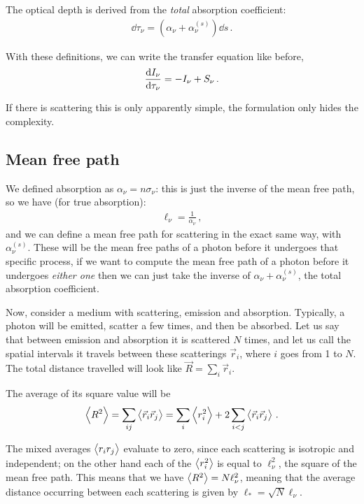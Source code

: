 \documentclass[main.tex]{subfiles}
\begin{document}
The optical depth is derived from the \emph{total} absorption coefficient: 
%
\begin{align}
\dd{\tau_{\nu }} = (\alpha_{\nu } + \alpha_{\nu }^{(s)}) \dd{s}
\,.
\end{align}

With these definitions, we can write the transfer equation like before, 
%
\begin{align}
\dv{I_\nu }{\tau_{\nu }} = - I_\nu + S_\nu 
\,.
\end{align}

If there is scattering this is only apparently simple, the formulation only hides the complexity. 

\subsection{Mean free path}

We defined absorption as \(\alpha_{\nu } = n \sigma_{\nu }\): this is just the inverse of the mean free path, so we have (for true absorption):
%
\begin{align}
\ell_{\nu } = \frac{1}{\alpha_{\nu }}
\,,
\end{align}
%
and we can define a mean free path for scattering in the exact same way, with \(\alpha_{\nu }^{(s)}\). 
These will be the mean free paths of a photon before it undergoes that specific process, if we want to compute the mean free path of a photon before it undergoes \emph{either one} then we can just take the inverse of \(\alpha_{\nu } + \alpha_{\nu }^{(s)}\), the total absorption coefficient. 

Now, consider a medium with scattering, emission and absorption. 
Typically, a photon will be emitted, scatter a few times, and then be absorbed. Let us say that between emission and absorption it is scattered \(N\) times, and let us call the spatial intervals it travels between these scatterings \(\vec{r}_i\), where \(i\) goes from 1 to \(N\). 
The total distance travelled will look like \(\vec{R} = \sum _{i} \vec{r}_i\). 

The average of its square value will be 
%
\begin{align}
\expval{R^2} = \sum _{ij} \expval{\vec{r}_i \vec{r}_j}
= \sum _{i} \expval{r_i^2} + 2 \sum _{i<j} \expval{\vec{r}_i \vec{r}_j}
\,.
\end{align}

The mixed averages \(\expval{r_i r_j}\) evaluate to zero, since each scattering is isotropic and independent; on the other hand each of the \(\expval{r_i^2}\) is equal to \(\ell_\nu^2\), the square of the mean free path. 
This means that we have \(\expval{R^2} = N \ell_\nu^2\), meaning that the average distance occurring between each scattering is given by \(\ell_{*} = \sqrt{N} \ell_{\nu }\). 
\end{document}
